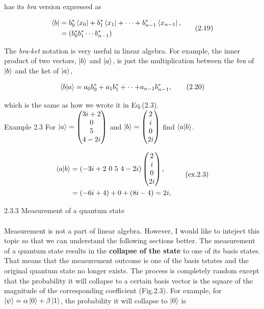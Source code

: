\documentclass{article}
\begin{document}
has its \textit{bra} version expressed as

\begin{align} \label{eq.2.19}
    \begin{split}
    \bra{b}&=b^*_{0}\bra{x_{0}}+b^*_{1}\bra{x_{1}}+\cdots+b^*_{n-1}\bra{x_{n-1}},\\
            &=(b^*_{0}b^*_{1}\cdots b^*_{n-1})
    \end{split} \tag{2.19}
\end{align}

The \textit{bra-ket} notation is very useful in linear algebra. For example,
the inner product of two vectors, $\ket{b}$ and $\ket{a}$, is just the multiplication
between the \textit{bra} of $\ket{b}$ and the ket of $\ket{a}$,

\begin{equation} \label{eq2.20}
    \braket{b|a}=a_{0}b^*_{0}+a_{1}b^*_{1}+\cdot\cdot+a_{n-1}b^*_{n-1}, \tag{2.20}
\end{equation}

which is the same as how we wrote it in Eq.(2.3).\\
Example 2.3 For $\ket{a}=\begin{pmatrix} 3i+2\\ 0\\ 5\\ 4-2i \end{pmatrix}$ and 
$\ket{b}=\begin{pmatrix} 2\\ i\\ 0\\ 2i \end{pmatrix}$ find $\braket{a|b}$.

\begin{align}
    \begin{split}
        \braket{a|b}&= (-3i +2 \ 0 \ 5 \ 4-2i)\begin{pmatrix}
            2\\ i\\ 0\\ 2i
        \end{pmatrix}, \\
        &=(-6i+4)+0+(8i-4)=2i,
    \end{split} \tag{ex.2.3}
\end{align}

2.3.3 Measurement of a quantum state
\\
\\
Measurement is not a part of linear algebra. However, I would like to inteject this
topic so that we can understand the following sections better. The measurement of a 
quantum state results in the \textbf{collapse of the state} to one of its basis states.
That means that the measurement outcome is one of the basis tstates and the original quantum state no longer exists.
The process is completely random except that the probability it will collapse to a certain basis vector is the square
of the magnitude of the corresponding coefficient (Fig.2.3). For example, for $\ket{\psi}=\alpha\ket{0}+\beta\ket{1}$,
the probability it will collapse to $\ket{0}$ is
\end{document}
